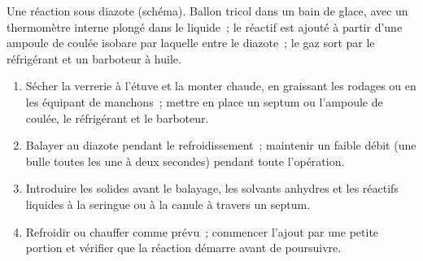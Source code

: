 \begin{omfigure}
\par\vspace{4pt}

{\small Une réaction sous diazote (schéma). Ballon tricol dans un bain de glace, avec un thermomètre
interne plongé dans le liquide~; le réactif est ajouté à partir d'une ampoule de coulée isobare par
laquelle entre le diazote~; le gaz sort par le réfrigérant et un barboteur à huile.}
\end{omfigure}

\begin{method}\label{met:b2:lab-techniques-2:anhydrous}
\begin{enumerate}
  \item Sécher la verrerie à l'étuve et la monter chaude, en graissant les rodages ou en les équipant de
        manchons~; mettre en place un septum ou l'ampoule de coulée, le réfrigérant et le barboteur.
  \item Balayer au diazote pendant le refroidissement~; maintenir un faible débit (une bulle toutes les
        une à deux secondes) pendant toute l'opération.
  \item Introduire les solides avant le balayage, les solvants anhydres et les réactifs liquides à la
        seringue ou à la canule à travers un septum.
  \item Refroidir ou chauffer comme prévu~; commencer l'ajout par une petite portion et vérifier que la
        réaction démarre avant de poursuivre.
\end{enumerate}
\end{method}

